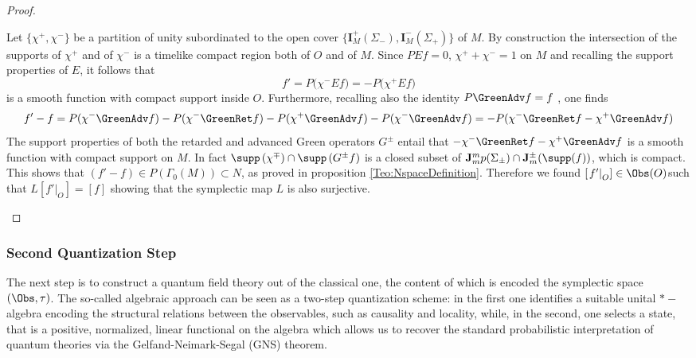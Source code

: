 \documentclass[Main]{subfiles}
\begin{document}
\begin{proof}
\begin{itemize}
									Let $\{\chi^+,\chi^-\}$ be a partition of unity subordinated to the open cover $\{\mathbf{I}^+_M(\Sigma_-), \mathbf{I}^-_M(\Sigma_+)\}$ of $M$.
									By construction the intersection of the supports of $\chi^+$ and of $\chi^-$ is a timelike compact region both of $O$ and of $M$.
									Since $PE f = 0$, $\chi^+ +\chi^-=1$ on $M$ and recalling the support properties of $E$, it follows that
									\begin{displaymath}
									f' = P\big( \chi^- E f \big) =  - P \big( \chi^+ E f \big)
									\end{displaymath}
									is a smooth function with compact support inside $O$.
									Furthermore, recalling also the identity $P \GreenAdv f = f$ , one finds
									\begin{displaymath}
									f' -f = P(\chi^- \GreenAdv f) - P ( \chi^- \GreenRet f ) - P ( \chi^+ \GreenAdv f) - P(\chi^- \GreenAdv f) = - P(\chi^- \GreenRet f - \chi^+ \GreenAdv f )
									\end{displaymath}
									The support properties of both the retarded and advanced Green operators $G^\pm$ entail that $-\chi^-\GreenRet f - \chi^+ \GreenAdv f$ is a smooth function with compact support on $M$. In fact $\supp\left(\chi^\mp\right) \cap \supp\left(G^\pm f \right)$ is a closed subset of $\mathbf{J}_m^mp(\Sigma_\pm) \cap \mathbf{J}_m^\pm(\supp(f))$, which is compact.\\
									This shows that $\left( f' -f  \right)\in P\left(\Gamma_0(M)\right) \subset N$, as proved in proposition \ref{Teo:NspaceDefinition}.
									Therefore we found $\left[\left. f'\right\vert_O\right] \in \Obs(O)$such that $L\left[ \left. f' \right\vert_O\right]=[ f ]$ showing that the symplectic map $L$ is also surjective.
						\end{itemize}
				\end{proof}
\fi


	\subsubsection{Second Quantization Step}%
		The next step is to construct a quantum field theory out of the classical one, the content of which is encoded the symplectic space $(\Obs, \tau)$.
		The so-called algebraic approach can be seen as a two-step quantization scheme:
		in the first one identifies a suitable unital  $\ast-$algebra encoding the structural relations between the observables, such as causality and locality, while, in the second, one selects a state, that is a positive, normalized, linear functional on the algebra which allows us to recover the standard probabilistic interpretation of quantum theories via the Gelfand-Neimark-Segal (GNS) theorem.
\end{document}
